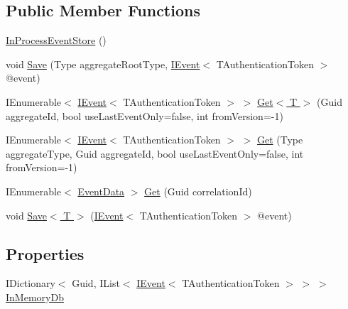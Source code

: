 \subsection*{Public Member Functions}
\begin{DoxyCompactItemize}
\item 
\hyperlink{classCqrs_1_1Ninject_1_1InProcess_1_1EventStore_1_1InProcessEventStore_a090c182760c5dc3792ebf5ac0dc7c5ee_a090c182760c5dc3792ebf5ac0dc7c5ee}{In\+Process\+Event\+Store} ()
\item 
void \hyperlink{classCqrs_1_1Ninject_1_1InProcess_1_1EventStore_1_1InProcessEventStore_a21816423f7b71249f3dc7ce14952e1e5_a21816423f7b71249f3dc7ce14952e1e5}{Save} (Type aggregate\+Root\+Type, \hyperlink{interfaceCqrs_1_1Events_1_1IEvent}{I\+Event}$<$ T\+Authentication\+Token $>$ @event)
\item 
I\+Enumerable$<$ \hyperlink{interfaceCqrs_1_1Events_1_1IEvent}{I\+Event}$<$ T\+Authentication\+Token $>$ $>$ \hyperlink{classCqrs_1_1Ninject_1_1InProcess_1_1EventStore_1_1InProcessEventStore_a154f3f96109d63a3bf442a72c1bb0525_a154f3f96109d63a3bf442a72c1bb0525}{Get$<$ T $>$} (Guid aggregate\+Id, bool use\+Last\+Event\+Only=false, int from\+Version=-\/1)
\item 
I\+Enumerable$<$ \hyperlink{interfaceCqrs_1_1Events_1_1IEvent}{I\+Event}$<$ T\+Authentication\+Token $>$ $>$ \hyperlink{classCqrs_1_1Ninject_1_1InProcess_1_1EventStore_1_1InProcessEventStore_a45144027681fe901b1f0db3de9dc7b21_a45144027681fe901b1f0db3de9dc7b21}{Get} (Type aggregate\+Type, Guid aggregate\+Id, bool use\+Last\+Event\+Only=false, int from\+Version=-\/1)
\item 
I\+Enumerable$<$ \hyperlink{classCqrs_1_1Events_1_1EventData}{Event\+Data} $>$ \hyperlink{classCqrs_1_1Ninject_1_1InProcess_1_1EventStore_1_1InProcessEventStore_ae07e89f6a8ca48d7d7f25d8a52703fbd_ae07e89f6a8ca48d7d7f25d8a52703fbd}{Get} (Guid correlation\+Id)
\item 
void \hyperlink{classCqrs_1_1Ninject_1_1InProcess_1_1EventStore_1_1InProcessEventStore_a393924b175c56585bd4b5065d1b36f3e_a393924b175c56585bd4b5065d1b36f3e}{Save$<$ T $>$} (\hyperlink{interfaceCqrs_1_1Events_1_1IEvent}{I\+Event}$<$ T\+Authentication\+Token $>$ @event)
\end{DoxyCompactItemize}
\subsection*{Properties}
\begin{DoxyCompactItemize}
\item 
I\+Dictionary$<$ Guid, I\+List$<$ \hyperlink{interfaceCqrs_1_1Events_1_1IEvent}{I\+Event}$<$ T\+Authentication\+Token $>$ $>$ $>$ \hyperlink{classCqrs_1_1Ninject_1_1InProcess_1_1EventStore_1_1InProcessEventStore_a189745cc74bcc2f0caac135c87296242_a189745cc74bcc2f0caac135c87296242}{In\+Memory\+Db}
\end{DoxyCompactItemize}


